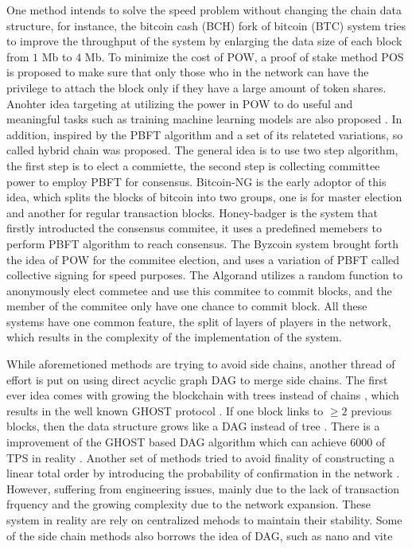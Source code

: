 One method intends to solve the speed problem without changing the chain data structure, for instance, 
the bitcoin cash (BCH) fork of bitcoin (BTC) system tries to improve the throughput of the system by enlarging the data size of each block from $1$ Mb to $4$ Mb. 
To minimize the cost of POW, a proof of stake method POS \cite{wood2014ethereum} is proposed to make sure that only those who in the network can have the privilege to attach the block only if they have a large amount of token shares.
Anohter idea targeting at utilizing the power in POW to do useful and meaningful tasks such as training machine learning models are also proposed \cite{matthew2017aion}.
In addition, inspired by the PBFT algorithm \cite{castro1999practical} and a set of its relateted variations, so called hybrid chain was proposed. 
The general idea is to use two step algorithm, the first step is to elect a commiette, the second step is collecting committee power to employ PBFT for consensus.
Bitcoin-NG \cite{eyal2016bitcoin} is the early adoptor of this idea, which splits the blocks of bitcoin into two groups, one is for master election and another for regular transaction blocks. 
Honey-badger \cite{miller2016honey} is the system that firstly introducted the consensus commitee, it uses a predefined memebers to perform PBFT algorithm to reach consensus.  
The Byzcoin system \cite{kogias2016enhancing} brought forth the idea of POW for the commitee election, and uses a variation of PBFT called collective signing for speed purposes.
The Algorand \cite{gilad2017algorand} utilizes a random function to anonymously elect commetee and use this commitee to commit blocks, and the member of the commitee only have one chance to commit block.
All these systems have one common feature, the split of layers of players in the network, which results in the complexity of the implementation of the system.

While aforemetioned methods are trying to avoid side chains, another thread of effort is put on using direct acyclic graph DAG to merge side chains.
The first ever idea comes with growing the blockchain with trees instead of chains \cite{sompolinsky2013accelerating}, which results in the well known GHOST protocol \cite{sompolinsky2015secure}.
If one block links to $\geq 2$ previous blocks, then the data structure grows like a DAG instead of tree \cite{sompolinsky2016spectre, sompolinskyphantom, lewenberg2015inclusive}.
There is a improvement of the GHOST based DAG algorithm which can achieve $6000$ of TPS in reality \cite{li2018scaling}.
Another set of methods tried to avoid finality of constructing a linear total order by introducing the probability of confirmation in the network \cite{popov2016tangle, churyumov2016byteball}. 
However, suffering from engineering issues, mainly due to the lack of transaction frquency and the growing complexity due to the network expansion.
These system in reality are rely on centralized mehods to maintain their stability.
Some of the side chain methods also borrows the idea of DAG, such as nano \cite{lemahieu2018nano} and vite \cite{liuvite}

